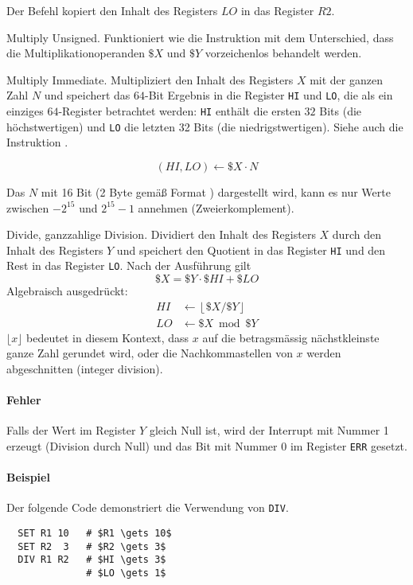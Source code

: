 Der Befehl  kopiert den Inhalt des Registers $LO$ in das Register
$R2$.


\glqq Multiply Unsigned\grqq.
Funktioniert wie die Instruktion  mit dem Unterschied, dass die
Multiplikationoperanden $\$X$ und $\$Y$ vorzeichenlos behandelt werden. 



\glqq Multiply Immediate\grqq.
Multipliziert den Inhalt des Registers $X$ mit der ganzen Zahl $N$ und speichert
das $64$-Bit Ergebnis in die Register \texttt{HI} und \texttt{LO}, die als ein
einziges $64$-Register betrachtet werden: \texttt{HI} enthält die ersten $32$
Bits (die höchstwertigen) und \texttt{LO} die letzten 32 Bits (die
niedrigstwertigen).
Siehe auch die Instruktion .

\[
   (HI, LO) \gets \$X \cdot N
\]

Das $N$ mit 16 Bit (2 Byte gemäß Format ) dargestellt wird, kann
es nur Werte zwischen $-2^{15}$ und $2^{15} - 1$ annehmen (Zweierkomplement).



\glqq Divide\grqq, ganzzahlige Division.
Dividiert den Inhalt des Registers $X$ durch den Inhalt des Registers $Y$ und
speichert den Quotient in das Register \texttt{HI} und den Rest in das Register
\texttt{LO}.
Nach der Ausführung gilt
\[
    \$X = \$Y \cdot \$HI + \$LO
\]
Algebraisch ausgedrückt:
\begin{align*}
  HI & \gets \left\lfloor \$X/\$Y \right\rfloor \\
  LO & \gets \$X \bmod \$Y
\end{align*}
$\lfloor x \rfloor$ bedeutet in diesem Kontext, dass $x$ auf die betragsmässig
nächstkleinste ganze Zahl gerundet wird, oder die Nachkommastellen von $x$
werden abgeschnitten (integer division).


\paragraph{Fehler}
Falls der Wert im Register $Y$ gleich Null ist, wird der Interrupt mit Nummer 1
erzeugt (Division durch Null) und das Bit mit Nummer 0 im Register \texttt{ERR}
gesetzt.

\paragraph{Beispiel}
Der folgende Code demonstriert die Verwendung von \texttt{DIV}.
\begin{lstlisting}
  SET R1 10   # $R1 \gets 10$
  SET R2  3   # $R2 \gets 3$
  DIV R1 R2   # $HI \gets 3$
              # $LO \gets 1$
\end{lstlisting}




